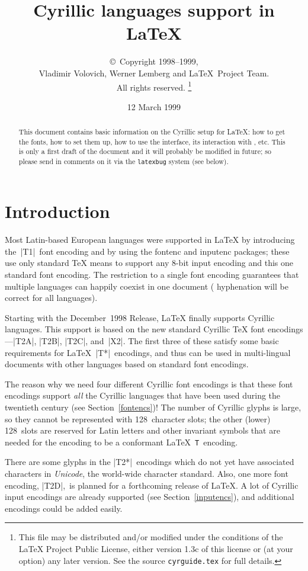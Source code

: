 \documentclass{ltxguide}[1999/02/28]
\title{Cyrillic languages support in \LaTeX}
\author{\copyright~Copyright 1998--1999,\\ Vladimir Volovich,
        Werner Lemberg and \LaTeX\ Project Team.\\ All rights reserved.%
        \footnote{This file may be distributed and/or modified under the
          conditions of the \LaTeX{} Project Public License, either version 1.3c
          of this license or (at your option) any later version. See the source
         \texttt{cyrguide.tex} for full details.}%
}
\date{12 March 1999}
\begin{document}
\maketitle
\tableofcontents

\begin{abstract}
  This document contains basic information on the Cyrillic setup for
  \LaTeX{}: how to get the fonts, how to set them up, how to use
  the interface, its interaction with \babel{}, etc. This is only a first
  draft of the document and it will probably be modified in future; so
  please send in comments on it via the \texttt{latexbug} system
  (see below).
\end{abstract}


\section{Introduction}

Most Latin-based European languages were supported in \LaTeX{} by
introducing the~|T1|~font encoding and by using the \textsf{fontenc}
and \textsf{inputenc} packages; these use only standard \TeX{} means
to support any \mbox{8-bit} input encoding and this one standard font
encoding.  The restriction to a single font encoding guarantees that
multiple languages can happily coexist in one document (\eg
hyphenation will be correct for all languages).

Starting with the December~1998 Release, \LaTeX{} finally supports
Cyrillic languages.  This support is based on the new standard
Cyrillic \TeX{} font encodings---|T2A|, |T2B|, |T2C|, and~|X2|.  The
first three of these satisfy some basic requirements for
\LaTeX{}~|T*|~encodings, and thus can be used in multi-lingual documents
with other languages based on standard font encodings.

The reason why we need four different Cyrillic font encodings is that
these font encodings support \emph{all} the Cyrillic languages that
have been used during the twentieth century (see
Section~\ref{fontencs})!  The number of Cyrillic glyphs is large, so
they cannot be represented with 128~character slots; the other (lower)
128~slots are reserved for Latin letters and other invariant symbols
that are needed for the encoding to be a conformant
\LaTeX{}~\texttt{T}~encoding.

There are some glyphs in the |T2*|~encodings which do not yet have
associated characters in \emph{Unicode}, the world-wide character
standard.  Also, one more font encoding, |T2D|,~is planned for a
forthcoming release of \LaTeX{}.  A lot of Cyrillic input encodings
are already supported (see Section~\ref{inputencs}), and additional
encodings could be added easily.
\end{document}
